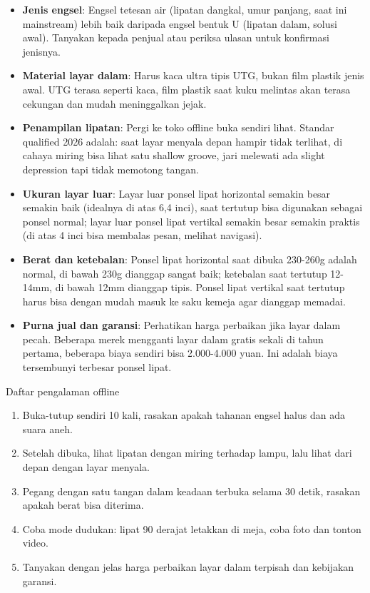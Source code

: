 \begin{itemize}
  \item \textbf{Jenis engsel}: Engsel tetesan air (lipatan dangkal, umur panjang, saat ini mainstream) lebih baik daripada engsel bentuk U (lipatan dalam, solusi awal). Tanyakan kepada penjual atau periksa ulasan untuk konfirmasi jenisnya.
  \item \textbf{Material layar dalam}: Harus kaca ultra tipis UTG, bukan film plastik jenis awal. UTG terasa seperti kaca, film plastik saat kuku melintas akan terasa cekungan dan mudah meninggalkan jejak.
  \item \textbf{Penampilan lipatan}: Pergi ke toko offline buka sendiri lihat. Standar qualified 2026 adalah: saat layar menyala depan hampir tidak terlihat, di cahaya miring bisa lihat satu shallow groove, jari melewati ada slight depression tapi tidak memotong tangan.
  \item \textbf{Ukuran layar luar}: Layar luar ponsel lipat horizontal semakin besar semakin baik (idealnya di atas 6,4 inci), saat tertutup bisa digunakan sebagai ponsel normal; layar luar ponsel lipat vertikal semakin besar semakin praktis (di atas 4 inci bisa membalas pesan, melihat navigasi).
  \item \textbf{Berat dan ketebalan}: Ponsel lipat horizontal saat dibuka 230-260g adalah normal, di bawah 230g dianggap sangat baik; ketebalan saat tertutup 12-14mm, di bawah 12mm dianggap tipis. Ponsel lipat vertikal saat tertutup harus bisa dengan mudah masuk ke saku kemeja agar dianggap memadai.
  \item \textbf{Purna jual dan garansi}: Perhatikan harga perbaikan jika layar dalam pecah. Beberapa merek mengganti layar dalam gratis sekali di tahun pertama, beberapa biaya sendiri bisa 2.000-4.000 yuan. Ini adalah biaya tersembunyi terbesar ponsel lipat.
\end{itemize}

\begin{tcbpractice}{Daftar pengalaman offline}
\begin{enumerate}
  \item Buka-tutup sendiri 10 kali, rasakan apakah tahanan engsel halus dan ada suara aneh.
  \item Setelah dibuka, lihat lipatan dengan miring terhadap lampu, lalu lihat dari depan dengan layar menyala.
  \item Pegang dengan satu tangan dalam keadaan terbuka selama 30 detik, rasakan apakah berat bisa diterima.
  \item Coba mode dudukan: lipat 90 derajat letakkan di meja, coba foto dan tonton video.
  \item Tanyakan dengan jelas harga perbaikan layar dalam terpisah dan kebijakan garansi.
\end{enumerate}

\end{tcbpractice}

